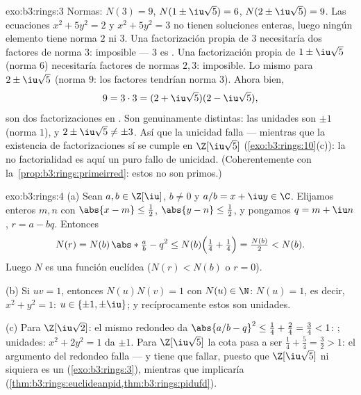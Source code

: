 \begin{solution}{exo:b3:rings:3}
Normas: $N(3) = 9$, $N(1 \pm \iu\sqrt5) = 6$, $N(2 \pm \iu\sqrt5) =
9$. Las ecuaciones $x^2 + 5y^2 = 2$ y $x^2 + 5y^2 = 3$ no tienen
soluciones enteras, luego ningún elemento tiene norma $2$ ni $3$. Una
factorización propia de $3$ necesitaría dos factores de norma $3$:
imposible --- $3$ es .
Una factorización propia de $1
\pm \iu\sqrt5$ (norma $6$) necesitaría factores de normas $2, 3$:
imposible. Lo mismo para $2 \pm \iu\sqrt5$ (norma $9$: los factores
tendrían norma $3$). Ahora bien,
\[
9 = 3 \cdot 3 = (2 + \iu\sqrt5)(2 - \iu\sqrt5),
\]
son dos factorizaciones en
. Son genuinamente
distintas: las unidades son $\pm 1$ (norma $1$), y $2 \pm \iu\sqrt5
\neq \pm 3$. Así que la unicidad falla --- mientras que la existencia de
factorizaciones sí se cumple en $\Z[\iu\sqrt5]$
(\cref{exo:b3:rings:10}(c)): la no factorialidad es aquí un puro fallo
de unicidad. (Coherentemente con la~\cref{prop:b3:rings:primeirred}:
estos  no son primos.)
\end{solution}

\begin{solution}{exo:b3:rings:4}
(a) Sean $a, b \in \Z[\iu]$, $b \neq 0$ y $a/b = x + \iu y \in
\C$. Elijamos enteros $m, n$ con $\abs{x - m} \leq \frac12$,
$\abs{y - n} \leq \frac12$, y pongamos $q = m + \iu n$, $r = a - bq$.
Entonces
\[
N(r) = N(b)\,\abs*{\tfrac ab - q}^2
\leq N(b)\Bigl(\tfrac14 + \tfrac14\Bigr) = \tfrac{N(b)}2 < N(b).
\]
Luego $N$ es una función euclídea
($N(r) < N(b)$ o $r = 0$).

(b) Si $uv = 1$, entonces $N(u)N(v) = 1$ con $N(u) \in \N$: $N(u) =
1$, es decir, $x^2 + y^2 = 1$: $u \in \{\pm 1, \pm\iu\}$; y
recíprocamente estos son unidades.

(c) Para $\Z[\iu\sqrt2]$: el mismo redondeo da $\abs{a/b - q}^2
\leq \frac14 + \frac{2}4 = \frac34 < 1$:
; unidades: $x^2 +
2y^2 = 1$ da $\pm 1$. Para $\Z[\iu\sqrt5]$ la cota pasa a ser
$\frac14 + \frac54 = \frac32 > 1$: el argumento del redondeo falla --- y
tiene que fallar, puesto que $\Z[\iu\sqrt5]$ ni siquiera es un
 (\cref{exo:b3:rings:3}), mientras que
 implicaría
(\cref{thm:b3:rings:euclideanpid,thm:b3:rings:pidufd}).
\end{solution}


